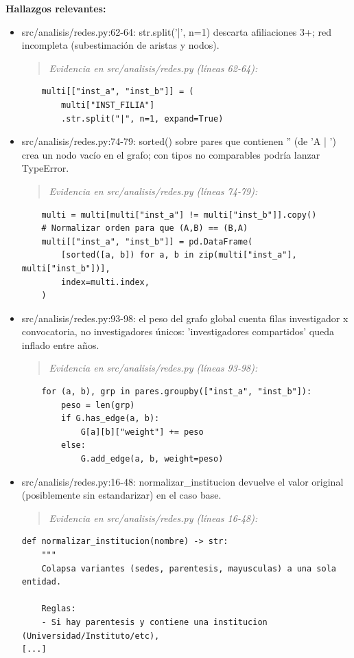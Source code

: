 \textbf{Hallazgos relevantes:}
\begin{itemize}
  \item src/analisis/redes.py:62-64: str.split('|', n=1) descarta afiliaciones 3+; red incompleta (subestimación de aristas y nodos).
\begin{quote}\footnotesize\ttfamily
\noindent\emph{Evidencia en src/analisis/redes.py (líneas 62-64):}
\end{quote}
\begin{lstlisting}
    multi[["inst_a", "inst_b"]] = (
        multi["INST_FILIA"]
        .str.split("|", n=1, expand=True)
\end{lstlisting}

  \item src/analisis/redes.py:74-79: sorted() sobre pares que contienen '' (de 'A | ') crea un nodo vacío en el grafo; con tipos no comparables podría lanzar TypeError.
\begin{quote}\footnotesize\ttfamily
\noindent\emph{Evidencia en src/analisis/redes.py (líneas 74-79):}
\end{quote}
\begin{lstlisting}
    multi = multi[multi["inst_a"] != multi["inst_b"]].copy()
    # Normalizar orden para que (A,B) == (B,A)
    multi[["inst_a", "inst_b"]] = pd.DataFrame(
        [sorted([a, b]) for a, b in zip(multi["inst_a"], multi["inst_b"])],
        index=multi.index,
    )
\end{lstlisting}

  \item src/analisis/redes.py:93-98: el peso del grafo global cuenta filas investigador x convocatoria, no investigadores únicos: 'investigadores compartidos' queda inflado entre años.
\begin{quote}\footnotesize\ttfamily
\noindent\emph{Evidencia en src/analisis/redes.py (líneas 93-98):}
\end{quote}
\begin{lstlisting}
    for (a, b), grp in pares.groupby(["inst_a", "inst_b"]):
        peso = len(grp)
        if G.has_edge(a, b):
            G[a][b]["weight"] += peso
        else:
            G.add_edge(a, b, weight=peso)
\end{lstlisting}

  \item src/analisis/redes.py:16-48: normalizar\_institucion devuelve el valor original (posiblemente sin estandarizar) en el caso base.
\begin{quote}\footnotesize\ttfamily
\noindent\emph{Evidencia en src/analisis/redes.py (líneas 16-48):}
\end{quote}
\begin{lstlisting}
def normalizar_institucion(nombre) -> str:
    """
    Colapsa variantes (sedes, parentesis, mayusculas) a una sola entidad.

    Reglas:
    - Si hay parentesis y contiene una institucion (Universidad/Instituto/etc),
[...]
\end{lstlisting}

\end{itemize}

